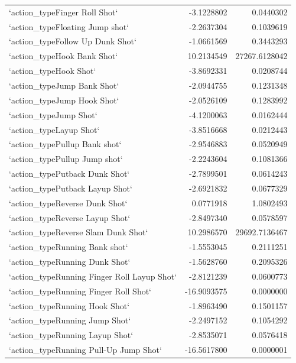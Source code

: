 \documentclass[american,]{article}
\begin{document}
\begin{longtable}{lrr}
`action\_typeFinger Roll Shot` & -3.1228802 & 0.0440302\\
\addlinespace
\rowcolor{gray!6}  `action\_typeFloating Jump shot` & -2.2637304 & 0.1039619\\
`action\_typeFollow Up Dunk Shot` & -1.0661569 & 0.3443293\\
\rowcolor{gray!6}  `action\_typeHook Bank Shot` & 10.2134549 & 27267.6128042\\
`action\_typeHook Shot` & -3.8692331 & 0.0208744\\
\rowcolor{gray!6}  `action\_typeJump Bank Shot` & -2.0944755 & 0.1231348\\
\addlinespace
`action\_typeJump Hook Shot` & -2.0526109 & 0.1283992\\
\rowcolor{gray!6}  `action\_typeJump Shot` & -4.1200063 & 0.0162444\\
`action\_typeLayup Shot` & -3.8516668 & 0.0212443\\
\rowcolor{gray!6}  `action\_typePullup Bank shot` & -2.9546883 & 0.0520949\\
`action\_typePullup Jump shot` & -2.2243604 & 0.1081366\\
\addlinespace
\rowcolor{gray!6}  `action\_typePutback Dunk Shot` & -2.7899501 & 0.0614243\\
`action\_typePutback Layup Shot` & -2.6921832 & 0.0677329\\
\rowcolor{gray!6}  `action\_typeReverse Dunk Shot` & 0.0771918 & 1.0802493\\
`action\_typeReverse Layup Shot` & -2.8497340 & 0.0578597\\
\rowcolor{gray!6}  `action\_typeReverse Slam Dunk Shot` & 10.2986570 & 29692.7136467\\
\addlinespace
`action\_typeRunning Bank shot` & -1.5553045 & 0.2111251\\
\rowcolor{gray!6}  `action\_typeRunning Dunk Shot` & -1.5628760 & 0.2095326\\
`action\_typeRunning Finger Roll Layup Shot` & -2.8121239 & 0.0600773\\
\rowcolor{gray!6}  `action\_typeRunning Finger Roll Shot` & -16.9093575 & 0.0000000\\
`action\_typeRunning Hook Shot` & -1.8963490 & 0.1501157\\
\addlinespace
\rowcolor{gray!6}  `action\_typeRunning Jump Shot` & -2.2497152 & 0.1054292\\
`action\_typeRunning Layup Shot` & -2.8535071 & 0.0576418\\
\rowcolor{gray!6}  `action\_typeRunning Pull-Up Jump Shot` & -16.5617800 & 0.0000001\\

\end{longtable}
\end{document}

